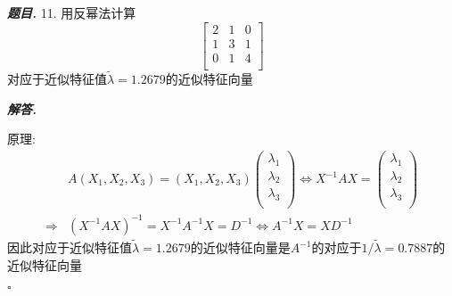\documentclass[10pt, a4paper, oneside]{ctexart}
\newenvironment{problem}{\begin{framed}\par\noindent\textbf{\textit{题目. }}}{\end{framed}\par}
\newenvironment{solution}{%
  \par\noindent\textbf{\textit{解答. }}\ignorespaces
}{%
  \hfill\ensuremath{\square}\par %
}
\begin{document}
    \begin{problem}
        11. 用反幂法计算 
        $$\begin{bmatrix}
            2&1&0\\
            1&3&1\\
            0&1&4\\
        \end{bmatrix}$$
        对应于近似特征值$\tilde{\lambda}=1.2679$的近似特征向量
    \end{problem}
    \begin{solution}
    原理:
    \begin{align*}
        &A(X_1,X_2,X_3)=(X_1,X_2,X_3)\begin{pmatrix}
            \lambda_1\\
            \lambda_2\\
            \lambda_3\\
        \end{pmatrix}\iff X^{-1}AX=\begin{pmatrix}
            \lambda_1\\
            \lambda_2\\
            \lambda_3\\
        \end{pmatrix}\\
        \Rightarrow& (X^{-1}AX)^{-1}=X^{-1}A^{-1}X=D^{-1}\iff A^{-1}X=XD^{-1}
    \end{align*}
    因此对应于近似特征值$\tilde{\lambda}=1.2679$的近似特征向量是$A^{-1}$的对应于$1/\tilde{\lambda}=0.7887$的近似特征向量
    

\end{solution}
\end{document}
